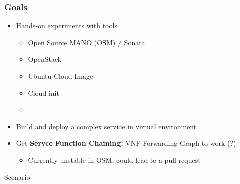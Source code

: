 \documentclass{beamer}
\begin{document}
{
\upbtitlebackground 
\begin{frame}
\titlepage %
\end{frame}
}



\begin{frame}
\frametitle{Goals}
\begin{itemize}
	\item Hands-on experiments with tools\\
	\begin{itemize}
		\item Open Source MANO (OSM) / Sonata
		\item OpenStack
		\item Ubuntu Cloud Image
		\item Cloud-init
		\item ...
	\end{itemize} \pause
	\item Build and deploy a complex service in virtual environment\pause
	\item Get \textbf{Servce Function Chaining:} VNF Forwarding Graph to work (?)	
	\begin{itemize}
		\item Currently unstable in OSM, could lead to a pull request
	\end{itemize}

\end{itemize}
\end{frame}


\begin{frame}
\Huge{\centerline{Scenario}}
\end{frame}
\end{document}
